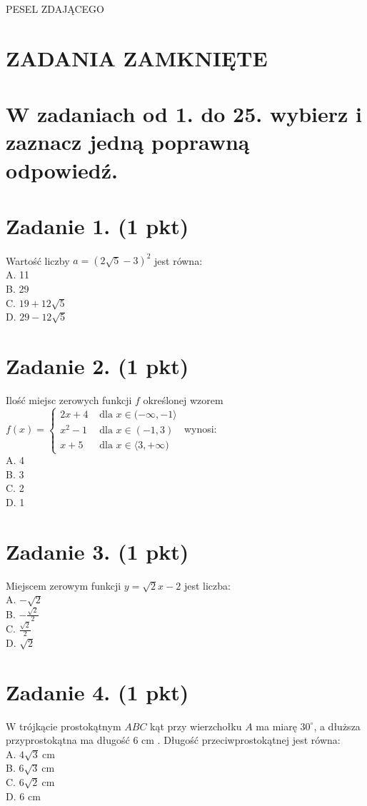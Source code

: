 \documentclass[10pt]{article}
\begin{document}
PESEL ZDAJĄCEGO

\section*{ZADANIA ZAMKNIĘTE}
\section*{W zadaniach od 1. do 25. wybierz i zaznacz jedną poprawną odpowiedź.}
\section*{Zadanie 1. (1 pkt)}
Wartość liczby \(a=(2 \sqrt{5}-3)^{2}\) jest równa:\\
A. 11\\
B. 29\\
C. \(19+12 \sqrt{5}\)\\
D. \(29-12 \sqrt{5}\)

\section*{Zadanie 2. (1 pkt)}
Ilość miejsc zerowych funkcji \(f\) określonej wzorem \(f(x)=\left\{\begin{array}{ll}2 x+4 & \text { dla } x \in(-\infty,-1\rangle \\ x^{2}-1 & \text { dla } x \in(-1,3) \\ x+5 & \text { dla } x \in\langle 3,+\infty)\end{array}\right.\) wynosi:\\
A. 4\\
B. 3\\
C. 2\\
D. 1

\section*{Zadanie 3. (1 pkt)}
Miejscem zerowym funkcji \(y=\sqrt{2} x-2\) jest liczba:\\
A. \(-\sqrt{2}\)\\
B. \(-\frac{\sqrt{2}}{2}\)\\
C. \(\frac{\sqrt{2}}{2}\)\\
D. \(\sqrt{2}\)

\section*{Zadanie 4. (1 pkt)}
W trójkącie prostokątnym \(A B C\) kąt przy wierzchołku \(A\) ma miarę \(30^{\circ}\), a dłuższa przyprostokątna ma długość 6 cm . Długość przeciwprostokątnej jest równa:\\
A. \(4 \sqrt{3} \mathrm{~cm}\)\\
B. \(6 \sqrt{3} \mathrm{~cm}\)\\
C. \(6 \sqrt{2} \mathrm{~cm}\)\\
D. 6 cm
\end{document}
